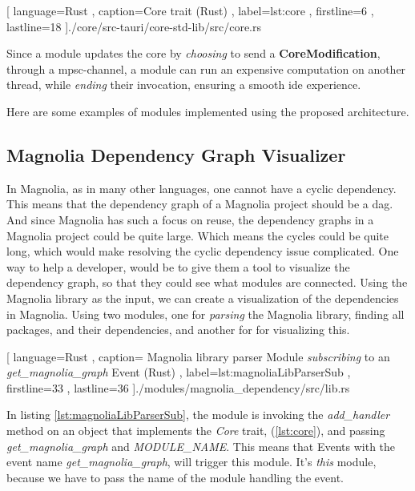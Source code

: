 \begin{center}
  
    [ language=Rust
    , caption={Core trait (Rust)}
    , label=lst:core
    , firstline=6
    , lastline=18
    ]{./core/src-tauri/core-std-lib/src/core.rs}
\end{center}

Since a module updates the core by \textit{choosing} to send a
\textbf{CoreModification}, through a \gls{mpsc}-channel, a module can run an
expensive computation on another thread, while \textit{ending} their
invocation, ensuring a smooth \gls{ide} experience.

Here are some examples of modules implemented using the proposed architecture.

\subsection{Magnolia Dependency Graph Visualizer}

In Magnolia, as in many other languages, one cannot have a cyclic dependency.
This means that the dependency graph of a Magnolia project should be a
\gls{dag}. And since Magnolia has such a focus on reuse, the dependency graphs
in a Magnolia project could be quite large. Which means the cycles could be
quite long, which would make resolving the cyclic dependency issue complicated.
One way to help a developer, would be to give them a tool to visualize the
dependency graph, so that they could see what modules are connected. Using the
Magnolia library as the input, we can create a visualization of the dependencies
in Magnolia. Using two modules, one for \textit{parsing} the Magnolia library,
finding all packages, and their dependencies, and another for for visualizing
this.

\begin{center}
  
    [ language=Rust
    , caption={
      Magnolia library parser Module \textit{subscribing} to an
      \textit{get\_magnolia\_graph } Event (Rust)
    }
    , label=lst:magnoliaLibParserSub
    , firstline=33
    , lastline=36
    ]{./modules/magnolia\_dependency/src/lib.rs}
\end{center}

In listing \ref{lst:magnoliaLibParserSub}, the module is invoking the
\textit{add\_handler} method on an object that implements the \textit{Core} trait,
(\ref{lst:core}), and passing \textit{get\_magnolia\_graph} and
\textit{MODULE\_NAME}. This means that Events with the event name
\textit{get\_magnolia\_graph}, will trigger this module. It's \textit{this}
module, because we have to pass the name of the module handling the event.

